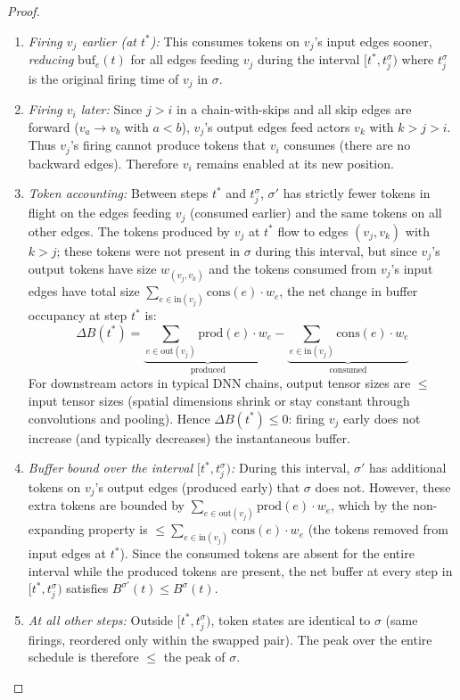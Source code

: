 \documentclass[journal]{IEEEtran}
\begin{document}
\begin{proof}
\begin{enumerate}[nosep]
\item \emph{Firing $v_j$ earlier (at $t^*$):} This consumes tokens on $v_j$'s input edges sooner, \emph{reducing} $\mathrm{buf}_e(t)$ for all edges feeding $v_j$ during the interval $[t^*, t_j^{\sigma})$ where $t_j^{\sigma}$ is the original firing time of $v_j$ in $\sigma$.
\item \emph{Firing $v_i$ later:} Since $j > i$ in a chain-with-skips and all skip edges are forward ($v_a \to v_b$ with $a < b$), $v_j$'s output edges feed actors $v_k$ with $k > j > i$. Thus $v_j$'s firing cannot produce tokens that $v_i$ consumes (there are no backward edges). Therefore $v_i$ remains enabled at its new position.
\item \emph{Token accounting:} Between steps $t^*$ and $t_j^{\sigma}$, $\sigma'$ has strictly fewer tokens in flight on the edges feeding $v_j$ (consumed earlier) and the same tokens on all other edges. The tokens produced by $v_j$ at $t^*$ flow to edges $(v_j, v_k)$ with $k > j$; these tokens were not present in $\sigma$ during this interval, but since $v_j$'s output tokens have size $w_{(v_j,v_k)}$ and the tokens consumed from $v_j$'s input edges have total size $\sum_{e \in \mathrm{in}(v_j)} \mathrm{cons}(e) \cdot w_e$, the net change in buffer occupancy at step $t^*$ is:
\begin{equation}
\Delta B(t^*) = \underbrace{\sum_{e \in \mathrm{out}(v_j)} \mathrm{prod}(e) \cdot w_e}_{\text{produced}} - \underbrace{\sum_{e \in \mathrm{in}(v_j)} \mathrm{cons}(e) \cdot w_e}_{\text{consumed}}
\end{equation}
For downstream actors in typical DNN chains, output tensor sizes are $\leq$ input tensor sizes (spatial dimensions shrink or stay constant through convolutions and pooling). Hence $\Delta B(t^*) \leq 0$: firing $v_j$ early does not increase (and typically decreases) the instantaneous buffer.
\item \emph{Buffer bound over the interval $[t^*, t_j^{\sigma})$:} During this interval, $\sigma'$ has additional tokens on $v_j$'s output edges (produced early) that $\sigma$ does not. However, these extra tokens are bounded by $\sum_{e \in \mathrm{out}(v_j)} \mathrm{prod}(e) \cdot w_e$, which by the non-expanding property is $\leq \sum_{e \in \mathrm{in}(v_j)} \mathrm{cons}(e) \cdot w_e$ (the tokens removed from input edges at $t^*$). Since the consumed tokens are absent for the entire interval while the produced tokens are present, the net buffer at every step in $[t^*, t_j^{\sigma})$ satisfies $B^{\sigma'}(t) \leq B^{\sigma}(t)$.
\item \emph{At all other steps:} Outside $[t^*, t_j^{\sigma})$, token states are identical to $\sigma$ (same firings, reordered only within the swapped pair). The peak over the entire schedule is therefore $\leq$ the peak of $\sigma$.
\end{enumerate}


\end{proof}
\end{document}

